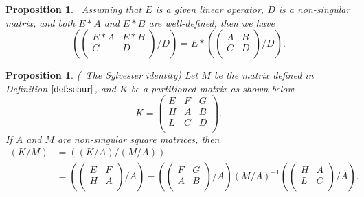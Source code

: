 \documentclass[preprint,12pt]{elsarticle}
\newtheorem{proposition}[theorem]{Proposition}
\begin{document}
\begin{proposition}\label{prop:E}\cite{wen20,wen25}%
~Assuming that $E$ is a given linear operator, $D$ is a non-singular matrix, and both $E \ast A$ and $E \ast B$ are well-defined, then we have
\begin{equation*}\label{equa2.9}
\left(\left(
   \begin{array}{cc}
     E*A & E*B \\
     C & D \\
   \end{array}
 \right)
/D\right)=E*\left(\left(
         \begin{array}{cc}
           A & B \\
           C & D \\
         \end{array}
       \right)
/D\right).
\end{equation*}
\end{proposition}

\begin{proposition}\label{prop:identity}(\cite{wen20,wen26}~{The Sylvester identity}) %
Let $M$ be the matrix defined in Definition $\ref{def:schur}$, and $K$ be a partitioned matrix as shown below
\begin{displaymath}
K=\left(
    \begin{array}{ccc}
      E & F & G \\
      H & A & B \\
      L & C & D \\
    \end{array}
  \right).
\end{displaymath}
If $A$ and $M$ are non-singular square matrices, then
\begin{align*}%
(K/M)&=((K/A)/(M/A))\\
&=\left(\left(
                       \begin{array}{cc}
                         E & F \\
                         H & A \\
                       \end{array}
                     \right)
/A\right)-\left(\left(
       \begin{array}{cc}
         F & G \\
         A & B \\
       \end{array}
     \right)
/A\right)(M/A)^{-1}\left(\left(
                \begin{array}{cc}
                  H & A \\
                  L & C \\
                \end{array}
              \right)
/A\right).
\end{align*}
\end{proposition}
\end{document}
